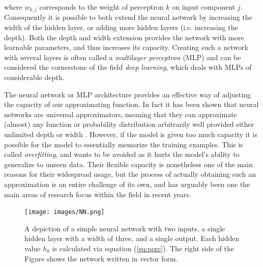 \documentclass{report}
\begin{document}
where $w_{k,j}$ corresponds to the weight of perceptron $k$ on input component $j$. Consequently it is possible to both extend the neural network by increasing the width of the hidden layer, or adding more hidden layers (i.e. increasing the depth). Both the depth and width extension provides the network with more learnable parameters, and thus increases its capacity. Creating such a network with several layers is often called a \textit{multilayer perceptron} (MLP) and can be considered the cornerstone of the field \textit{deep learning}, which deals with MLPs of considerable depth.

The neural network or MLP architecture provides an effective way of adjusting the capacity of our approximating function. In fact it has been shown that neural networks are universal approximators, meaning that they can approximate (almost) any function or probability distribution arbitrarily well provided either unlimited depth or width \cite{hornik1989multilayer, lu2020universal}. However, if the model is given too much capacity it is possible for the model to essentially memorize the training examples. This is called \textit{overfitting}, and wants to be avoided as it hurts the model's ability to generalize to unseen data. Their flexible capacity is nonetheless one of the main reasons for their widespread usage, but the process of actually obtaining such an approximation is an entire challenge of its own, and has arguably been one the main areas of research focus within the field in recent years.

\begin{figure}[H]
    \centering
    \texttt{[image: images/NN.png]}
    \caption{\onehalfspacing A depiction of a simple neural network with two inputs, a single hidden layer with a width of three, and a single output. Each hidden value $h_k$ is calculated via equation (\ref{eq:perc}). The right side of the Figure shows the network written in vector form.}
    \label{fig:NN}
\end{figure}
\end{document}
